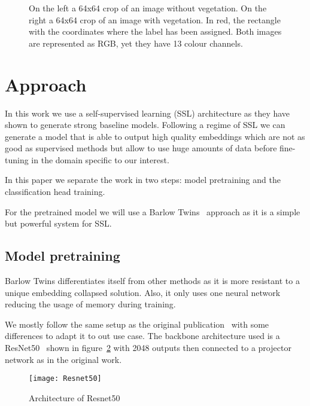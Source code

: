 \documentclass[conference]{IEEEtran}
\begin{document}
    \begin{figure}[h]
        \centering
        \qquad
        \caption{On the left a 64x64 crop of an image without vegetation. On the right a 64x64 crop of an image with vegetation.
        In red, the rectangle with the coordinates where the label has been assigned.
        Both images are represented as RGB, yet they have 13 colour channels.}
        \label{fig:vegetation_example}
    \end{figure}


    \section{Approach}
    In this work we use a self-supervised learning (SSL) architecture as they have shown to generate strong baseline models.
    Following a regime of SSL we can generate a model that is able to output high quality embeddings which are not
    as good as supervised methods but allow to use huge amounts of data before fine-tuning in the domain specific to our interest.

    In this paper we separate the work in two steps: model pretraining and the classification head training.

    For the pretrained model we will use a Barlow Twins~\cite{barlowtwins} approach as it is a simple but powerful system for
    SSL.

    \subsection{Model pretraining}
    Barlow Twins differentiates itself from other methods as it is more resistant to a unique embedding collapsed solution.
    Also, it only uses one neural network reducing the usage of memory during training.

    We mostly follow the same setup as the original publication~\cite{barlowtwins} with some differences to adapt it to out use case.
    The backbone architecture used is a ResNet50~\cite{he2015deep} shown in figure~\ref{fig:resnet50} with 2048 outputs then connected to a projector network as in the original work.

    \begin{figure}
        \centering
        \texttt{[image: Resnet50]}
        \caption{Architecture of Resnet50}
        \label{fig:resnet50}
    \end{figure}
\end{document}
